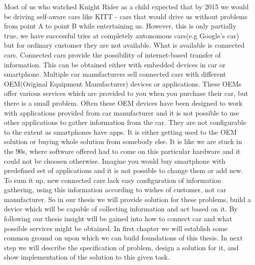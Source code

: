 Most of us who watched Knight Rider as a child expected that by 2015 we would be driving self-aware cars like KITT - cars that would drive us without problems from point A to point B while entertaining us. However, this is only partially true, we have successful tries at completely autonomous cars(e.g Google’s car) but for ordinary customer they are not available. What is available is connected cars. Connected cars provide the possibility of internet-based transfer of information. This can be obtained either with embedded devices in car or smartphone. Multiple car manufacturers sell connected cars with different OEM(Original Equipment Manufacturer) devices or applications. These OEMs offer various services which are provided to you when you purchase their car, but there is a small problem. Often these OEM devices have been designed to work with applications provided from car manufacturer and it is not possible to use other applications to gather information from the car. They are not configurable to the extent as smartphones have apps. It is either getting used to the OEM solution or buying whole solution from somebody else. It is like we are stuck in the 90s, where software offered had to come on this particular hardware and it could not be choosen otherwise. Imagine you would buy smartphone with predefined set of applications and it is not possible to change them or add new. To sum it up, new connected cars lack easy configuration of information gathering, using this information according to wishes of customer, not car manufacturer. So in our thesis we will provide solution for these problems, build a device which will be capable of collecting information and act based on it. By following our thesis insight will be gained into how to connect car and what possible services might be obtained. In first chapter we will establish some common ground on upon which we can build foundations of this thesis. In next step we will describe the specification of problem, design a solution for it, and show implementation of the solution to this given task.